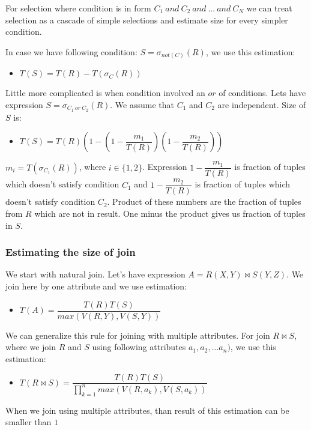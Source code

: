 For selection where condition is in form $C_1~and~C_2~and~...~and~C_N$ we can treat selection as a cascade of simple selections and estimate size for every simpler condition.

In case we have following condition: $S=\sigma_{not(C)}(R)$, we use this estimation:
\begin{itemize}
\item $T(S)=T(R)-T(\sigma_C(R))$
\end{itemize}

Little more complicated is when condition involved an $or$ of conditions. Lets have expression $S=\sigma_{C_1~or~C_2}(R)$. We assume that $C_1$ and $C_2$ are independent. Size of $S$ is:

\begin{itemize}
\item $T(S)=T(R)(1-(1-\dfrac{m_1}{T(R)})(1-\dfrac{m_2}{T(R)}))$
\end{itemize}

$m_i=T(\sigma_{C_1}(R))$, where $i\in\{1,2\}$. Expression $1-\dfrac{m_1}{T(R)}$ is fraction of tuples which doesn't satisfy condition $C_1$ and $1-\dfrac{m_2}{T(R)}$ is fraction of tuples which doesn't satisfy condition $C_2$. Product of these numbers are the fraction of tuples from $R$ which are not in result. One minus the product gives us fraction of tuples in $S$.

\subsubsection{Estimating the size of join}
\label{join}
We start with natural join. Let's have expression $A=R(X,Y)\Join S(Y,Z)$. We join here by one attribute and we use estimation:

\begin{itemize}
\item $T(A)=\dfrac{T(R)T(S)}{max(V(R,Y),V(S,Y))}$
\end{itemize}

We can generalize this rule for joining with multiple attributes. For join $R\Join S$, where we join $R$ and $S$ using following attributes $a_1,a_2,...a_n)$, we use this estimation:

\begin{itemize}
\item $T(R\Join S)=\dfrac{T(R)T(S)}{\prod_{k=1}^{n}{max(V(R,a_k),V(S,a_k))}}$
\end{itemize}

When we join using multiple attributes, than result of this estimation can be smaller than $1$

